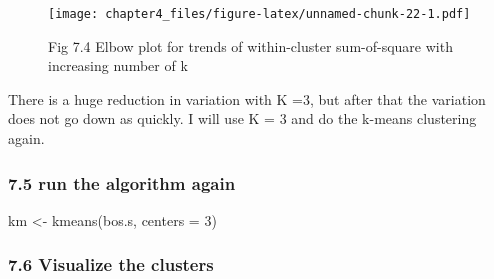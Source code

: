 \documentclass[
]{article}
\newenvironment{Shaded}{\begin{snugshade}}{\end{snugshade}}
\newcommand{\AttributeTok}[1]{\textcolor[rgb]{0.77,0.63,0.00}{#1}}
\newcommand{\CommentTok}[1]{\textcolor[rgb]{0.56,0.35,0.01}{\textit{#1}}}
\newcommand{\ControlFlowTok}[1]{\textcolor[rgb]{0.13,0.29,0.53}{\textbf{#1}}}
\newcommand{\DecValTok}[1]{\textcolor[rgb]{0.00,0.00,0.81}{#1}}
\newcommand{\FloatTok}[1]{\textcolor[rgb]{0.00,0.00,0.81}{#1}}
\newcommand{\FunctionTok}[1]{\textcolor[rgb]{0.00,0.00,0.00}{#1}}
\newcommand{\NormalTok}[1]{#1}
\newcommand{\OtherTok}[1]{\textcolor[rgb]{0.56,0.35,0.01}{#1}}
\newcommand{\SpecialCharTok}[1]{\textcolor[rgb]{0.00,0.00,0.00}{#1}}
\newcommand{\StringTok}[1]{\textcolor[rgb]{0.31,0.60,0.02}{#1}}
\begin{document}
\begin{figure}
\centering
\texttt{[image: chapter4\_files/figure-latex/unnamed-chunk-22-1.pdf]}
\caption{Fig 7.4 Elbow plot for trends of within-cluster sum-of-square
with increasing number of k}
\end{figure}

There is a huge reduction in variation with K =3, but after that the
variation does not go down as quickly. I will use K = 3 and do the
k-means clustering again.

\hypertarget{run-the-algorithm-again}{%
\subsubsection{7.5 run the algorithm
again}\label{run-the-algorithm-again}}

\begin{Shaded}
\begin{Highlighting}[]
\NormalTok{km }\OtherTok{\textless{}{-}} \FunctionTok{kmeans}\NormalTok{(bos.s, }\AttributeTok{centers =} \DecValTok{3}\NormalTok{)}
\end{Highlighting}
\end{Shaded}

\hypertarget{visualize-the-clusters}{%
\subsubsection{7.6 Visualize the
clusters}\label{visualize-the-clusters}}

\begin{Shaded}
\end{Shaded}
\end{document}
